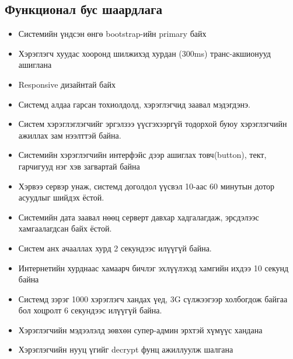   \subsection{Функционал бус шаардлага}
    \begin{itemize}
        \item Системийн үндсэн өнгө bootstrap-ийн primary байх
        \item Хэрэглэгч хуудас хооронд шилжихэд хурдан (300ms) транс-акшионууд ашиглана
        \item Responsive дизайнтай байх
        \item Системд алдаа гарсан тохиолдолд, хэрэглэгчид заавал мэдэгдэнэ.
        \item Систем хэрэглэглэгчийг эргэлзээ үүсгэхээргүй тодорхой буюу хэрэглэгчийн ажиллах зам нээлттэй байна.
        \item Системийн хэрэглэгчийн интерфэйс дээр ашиглах товч(button), тект, гарчигууд нэг хэв загвартай байна
        \item Хэрвээ сервэр унаж, системд доголдол үүсвэл 10-аас 60 минутын дотор асуудлыг шийдэх ёстой.
        \item Системийн дата заавал нөөц серверт давхар хадгалагдаж, эрсдэлээс хамгаалагдсан байх ёстой.
        \item Систем анх ачааллах хурд 2 секундээс илүүгүй байна.
        \item Интернетийн хурднаас хамаарч бичлэг эхлүүлэхэд хамгийн ихдээ 10 секунд байна
        \item Системд зэрэг 1000 хэрэглэгч хандах үед, 3G сүлжээгээр холбогдож байгаа бол хоцролт 6 секундээс илүүгүй байна.
        \item Хэрэглэгчийн мэдээлэлд зөвхөн супер-админ эрхтэй хүмүүс хандана
        \item Хэрэглэгчийн нууц үгийг decrypt фунц ажиллуулж шалгана
    \end{itemize}
\pagebreak
